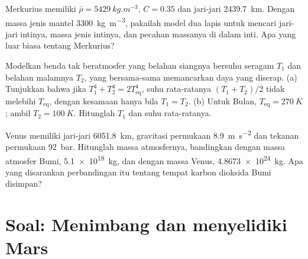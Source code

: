 \begin{exercise}[$\star\star\star$]\label{exo:b1:comparative-planetology:10}
Merkurius memiliki $\bar\rho = \qty{5429}{kg.m^{-3}}$, $C = 0.35$ dan jari-jari \qty{2439.7}{km}. Dengan massa jenis mantel \qty{3300}{kg.m^{-3}}, pakailah model dua lapis untuk mencari jari-jari intinya, massa jenis intinya, dan pecahan massanya di dalam inti. Apa yang luar biasa tentang Merkurius?
\end{exercise}

\begin{exercise}[$\star\star\star$]\label{exo:b1:comparative-planetology:11}
Modelkan benda tak beratmosfer yang belahan siangnya bersuhu seragam $T_1$ dan belahan malamnya $T_2$, yang bersama-sama memancarkan daya yang diserap. (a) Tunjukkan bahwa jika $T_1^4 + T_2^4 = 2T_\mathrm{eq}^4$, suhu rata-ratanya $(T_1 + T_2)/2$ tidak melebihi $T_\mathrm{eq}$, dengan kesamaan hanya bila $T_1 = T_2$. (b) Untuk Bulan, $T_\mathrm{eq} = \qty{270}{K}$; ambil $T_2 = \qty{100}{K}$. Hitunglah $T_1$ dan suhu rata-ratanya.
\end{exercise}

\begin{exercise}[$\star\star\star$]\label{exo:b1:comparative-planetology:12}
Venus memiliki jari-jari \qty{6051.8}{km}, gravitasi permukaan \qty{8.9}{m.s^{-2}} dan tekanan permukaan \qty{92}{bar}. Hitunglah massa atmosfernya, bandingkan dengan massa atmosfer Bumi, \qty{5.1e18}{kg}, dan dengan massa Venus, \qty{4.8673e24}{kg}. Apa yang disarankan perbandingan itu tentang tempat karbon dioksida Bumi disimpan?
\end{exercise}

\section{Soal: Menimbang dan menyelidiki Mars}

